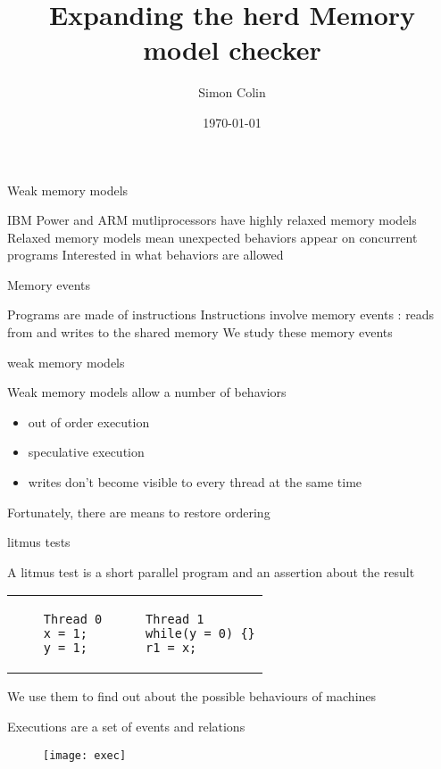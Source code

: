 \documentclass[dvipsnames,svgnames,beamer]{beamer}
\title{Expanding the herd Memory model checker}
\author{Simon Colin}
\date{\today}
\begin{document}
\begin{frame}
	\titlepage
\end{frame}

\begin{frame}{Weak memory models}

	IBM Power and ARM mutliprocessors have highly relaxed memory models
	\vfill
	Relaxed memory models mean unexpected behaviors appear on concurrent programs	
	\vfill
	Interested in what behaviors are allowed
	
\end{frame}

\begin{frame}{Memory events}

	Programs are made of instructions
	\vfill
	Instructions involve memory events : reads from and writes to the shared memory
	\vfill
	We study these memory events

\end{frame}

\begin{frame}{weak memory models}

	\vfill
	\vfill
	Weak memory models allow a number of behaviors\begin{itemize}
	\item out of order execution
	\item speculative execution
	\item writes don't become visible to every thread at the same time
	\end{itemize}
	\vfill
	Fortunately, there are means to restore ordering
	\vfill

\end{frame}

\begin{frame}[fragile]{litmus tests}

	A litmus test is a short parallel program and an assertion about the result
	\begin{tabular}{p{4cm} p{4cm}}
	\begin{verbatim}
	Thread 0
	x = 1;
	y = 1;
	\end{verbatim} &
	\begin{verbatim}
	Thread 1
	while(y = 0) {}
	r1 = x;
	\end{verbatim}
	\end{tabular}
	\vfill
	We use them to find out about the possible behaviours of machines

\end{frame}

\begin{frame}

	Executions are a set of events and relations
	\begin{figure}[b]
	\centering
	\texttt{[image: exec]}
	\end{figure}

\end{frame}
\end{document}
